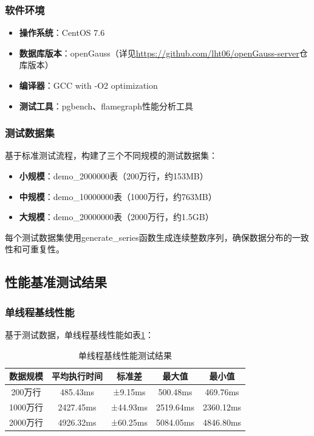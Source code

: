 \subsubsection{软件环境}
\begin{itemize}
    \item \textbf{操作系统}：CentOS 7.6
    \item \textbf{数据库版本}：openGauss（详见\url{https://github.com/lht06/openGauss-server}仓库版本）
    \item \textbf{编译器}：GCC with -O2 optimization
    \item \textbf{测试工具}：pgbench、flamegraph性能分析工具
\end{itemize}

\subsubsection{测试数据集}
基于标准测试流程，构建了三个不同规模的测试数据集：
\begin{itemize}
    \item \textbf{小规模}：demo\_2000000表（200万行，约153MB）
    \item \textbf{中规模}：demo\_10000000表（1000万行，约763MB）
    \item \textbf{大规模}：demo\_20000000表（2000万行，约1.5GB）
\end{itemize}

每个测试数据集使用generate\_series函数生成连续整数序列，确保数据分布的一致性和可重复性。

\subsection{性能基准测试结果}

\subsubsection{单线程基线性能}

基于测试数据，单线程基线性能如表\ref{tab:baseline_performance}：

\begin{table}[htbp]
\centering
\caption{单线程基线性能测试结果}
\label{tab:baseline_performance}
\begin{tabular}{|c|c|c|c|c|}
\hline
数据规模 & 平均执行时间 & 标准差 & 最大值 & 最小值 \\
\hline
200万行 & 485.43ms & ±9.15ms & 500.48ms & 469.76ms \\
1000万行 & 2427.45ms & ±44.93ms & 2519.64ms & 2360.12ms \\
2000万行 & 4926.32ms & ±60.25ms & 5084.05ms & 4846.80ms \\
\hline
\end{tabular}
\end{table}

